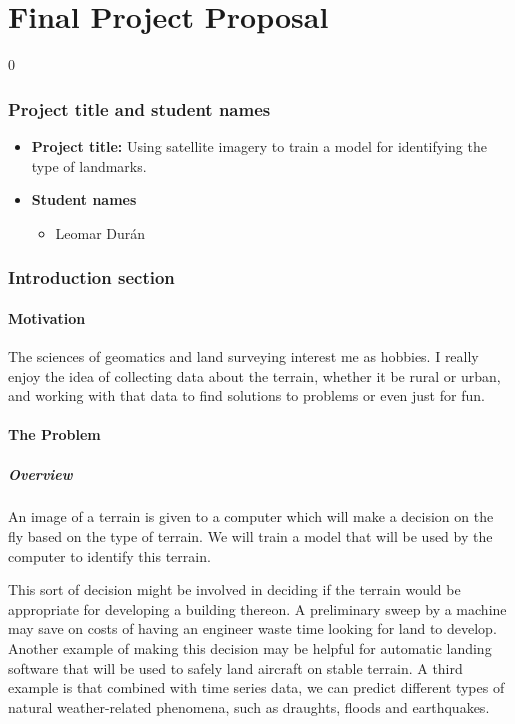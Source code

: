 \documentclass[11pt]{report}
\let\oldpart\part%
\renewcommand*\part[1]{\oldpart{#1}\setcounter{section}0}%
\begin{document}
\part{Final Project Proposal}

\section*{Project title and student names}
\begin{itemize}
    \item
        \textbf{Project title:}
        Using satellite imagery to train a model for identifying the type of landmarks.
    \item
        \textbf{Student names} 
        \begin{itemize}
            \item
                Leomar Durán
        \end{itemize}
\end{itemize}

\section{Introduction section}

\subsection{Motivation}

The sciences of geomatics and land surveying interest me as hobbies.
I really enjoy the idea of collecting data about the terrain,
whether it be rural or urban,
and working with that data to find solutions to problems
or even just for fun.

\subsection{The Problem}

\subsubsection{Overview}

An image of a terrain is given to a computer which will make a decision on the fly based on the type of terrain.
We will train a model that will be used by the computer to identify this terrain.

This sort of decision might be involved in deciding if the terrain would be appropriate for developing a building thereon.
A preliminary sweep by a machine may save on costs of having an engineer waste time looking for land to develop.
Another example of making this decision may be helpful for automatic landing software that will be used to safely land aircraft on stable terrain.
A third example is that combined with time series data, we can predict different types of natural weather-related phenomena,
such as draughts, floods and earthquakes.
\end{document}
